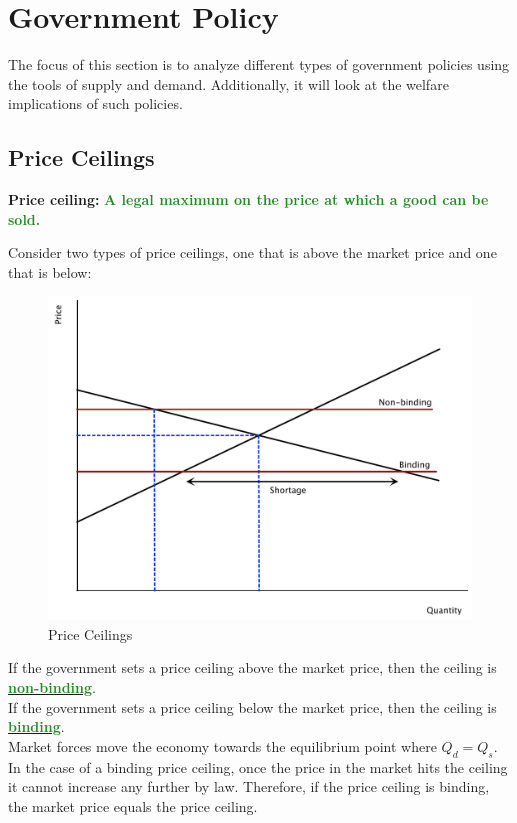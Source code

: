 \documentclass[11pt]{article}\usepackage[]{graphicx}\usepackage[]{color}
\theoremstyle{definition}
\newcommand{\ddp}[1]{{\textbf{\textcolor{ForestGreen}{#1}}}}
\newcommand{\dd}[1]{{\underline{\textbf{\textcolor{ForestGreen}{#1}}}}}
\newcommand{\defn}[1]{\textbf{#1}}
\begin{document}
	\section{Government Policy}
	
	The focus of this section is to analyze different types of government policies using the tools of supply and demand. Additionally, it will look at the welfare implications of such policies.
	
	\subsection{Price  Ceilings}
	
	\defn{Price ceiling:} \ddp{A legal maximum on the price at which a good can be sold.\\}
	
	Consider two types of price ceilings, one that is above the market price and one that is below:
	
		\begin{figure}[H]
			\centering
			\includegraphics[scale=.40]{plot34.pdf}
			\caption{Price Ceilings}
		\end{figure}
	
	If the government sets a price ceiling above the market price, then the ceiling is \dd{non-binding}.
	\\
	
	If the government sets a price ceiling below the market price, then the ceiling is \dd{binding}.
	\\
	
	Market forces move the economy towards the equilibrium point where $Q_d = Q_s$. In the case of a binding price ceiling, once the price in the market hits the ceiling it cannot increase any further by law. Therefore, if the price ceiling is binding, the market price equals the price ceiling.
	\\
	
\end{document}
